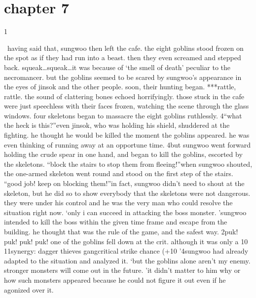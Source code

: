 \section{chapter 7}

                            1




 having said that, sungwoo then left the cafe.
 the eight goblins stood frozen on the spot as if they had run into a beast.
 then they even screamed and stepped back.
squeak…squeak…it was because of ‘the smell of death’ peculiar to the necromancer.
 but the goblins seemed to be scared by sungwoo’s appearance in the eyes of jinsok and the other people.
soon, their hunting began.
***rattle, rattle.
the sound of clattering bones echoed horrifyingly.
 those stuck in the cafe were just speechless with their faces frozen, watching the scene through the glass windows.
 four skeletons began to massacre the eight goblins ruthlessly.
4“what the heck is this?”even jinsok, who was holding his shield, shuddered at the fighting.
 he thought he would be killed the moment the goblins appeared.
 he was even thinking of running away at an opportune time.
4but sungwoo went forward holding the crude spear in one hand, and began to kill the goblins, escorted by the skeletons.
“block the stairs to stop them from fleeing!”when sungwoo shouted, the one-armed skeleton went round and stood on the first step of the stairs.
“good job! keep on blocking them!”in fact, sungwoo didn’t need to shout at the skeleton, but he did so to show everybody that the skeletons were not dangerous.
 they were under his control and he was the very man who could resolve the situation right now.
‘only i can succeed in attacking the boss monster.
’sungwoo intended to kill the boss within the given time frame and escape from the building.
 he thought that was the rule of the game, and the safest way.
2puk! puk! puk! puk!
one of the goblins fell down at the crit.
 although it was only a 10%
11synergy: dagger thieves gangcritical strike chance (+10%
’4sungwoo had already adapted to the situation and analyzed it.
‘but the goblins alone aren’t my enemy.
 stronger monsters will come out in the future.
’it didn’t matter to him why or how such monsters appeared because he could not figure it out even if he agonized over it.
